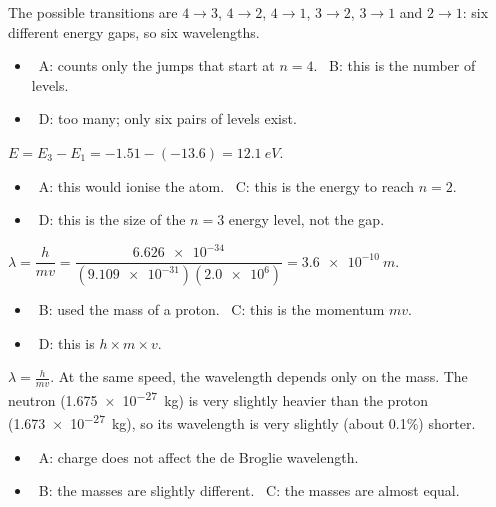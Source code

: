 \documentclass[12pt]{article}
\begin{document}
\begin{practiceanswers}
\begin{practiceans}
  The possible transitions are $4 \to 3$, $4 \to 2$, $4 \to 1$, $3 \to 2$, $3 \to 1$ and $2 \to 1$: six
  different energy gaps, so six wavelengths.
  \begin{itemize}
    \item \xmark\ A: counts only the jumps that start at $n = 4$. \quad \xmark\ B: this is the number of
          levels.
    \item \xmark\ D: too many; only six pairs of levels exist.
  \end{itemize}
\end{practiceans}

\begin{practiceans}
  $E = E_3 - E_1 = -1.51 - (-13.6) = \qty{12.1}{eV}$.
  \begin{itemize}
    \item \xmark\ A: this would ionise the atom. \quad \xmark\ C: this is the energy to reach $n = 2$.
    \item \xmark\ D: this is the size of the $n = 3$ energy level, not the gap.
  \end{itemize}
\end{practiceans}

\begin{practiceans}
  $\lambda = \dfrac{h}{mv} = \dfrac{\num{6.626e-34}}{(\num{9.109e-31})(\num{2.0e6})} = \qty{3.6e-10}{m}$.
  \begin{itemize}
    \item \xmark\ B: used the mass of a proton. \quad \xmark\ C: this is the momentum $mv$.
    \item \xmark\ D: this is $h \times m \times v$.
  \end{itemize}
\end{practiceans}

\begin{practiceans}
  $\lambda = \frac{h}{mv}$. At the same speed, the wavelength depends only on the mass. The neutron
  (\qty{1.675e-27}{kg}) is very slightly heavier than the proton (\qty{1.673e-27}{kg}), so its wavelength
  is very slightly (about 0.1\%) shorter.
  \begin{itemize}
    \item \xmark\ A: charge does not affect the de Broglie wavelength.
    \item \xmark\ B: the masses are slightly different. \quad \xmark\ C: the masses are almost equal.
  \end{itemize}
\end{practiceans}


\end{practiceanswers}
\end{document}
